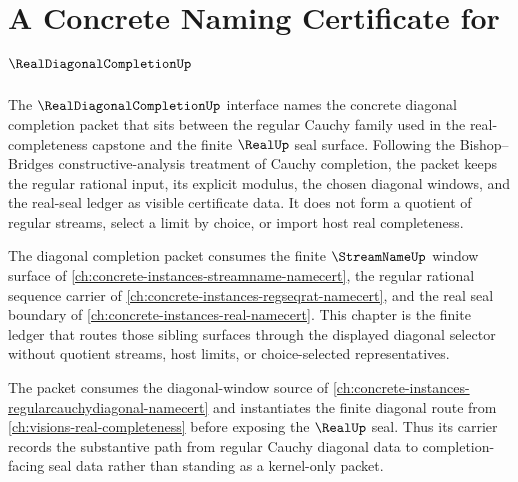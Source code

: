 \chapter{A Concrete Naming Certificate for $\RealDiagonalCompletionUp$}
\label{ch:concrete-instances-real-diagonal-completion-namecert}

The $\RealDiagonalCompletionUp$ interface names the concrete diagonal completion packet that sits between the regular Cauchy family used in the real-completeness capstone and the finite $\RealUp$ seal surface. Following the Bishop--Bridges constructive-analysis treatment of Cauchy completion, the packet keeps the regular rational input, its explicit modulus, the chosen diagonal windows, and the real-seal ledger as visible certificate data. It does not form a quotient of regular streams, select a limit by choice, or import host real completeness.

The diagonal completion packet consumes the finite $\StreamNameUp$ window surface of \autoref{ch:concrete-instances-streamname-namecert}, the regular rational sequence carrier of \autoref{ch:concrete-instances-regseqrat-namecert}, and the real seal boundary of \autoref{ch:concrete-instances-real-namecert}. This chapter is the finite ledger that routes those sibling surfaces through the displayed diagonal selector without quotient streams, host limits, or choice-selected representatives.

The packet consumes the diagonal-window source of \autoref{ch:concrete-instances-regularcauchydiagonal-namecert} and instantiates the finite diagonal route from \autoref{ch:visions-real-completeness} before exposing the $\RealUp$ seal. Thus its carrier records the substantive path from regular Cauchy diagonal data to completion-facing seal data rather than standing as a kernel-only packet.

